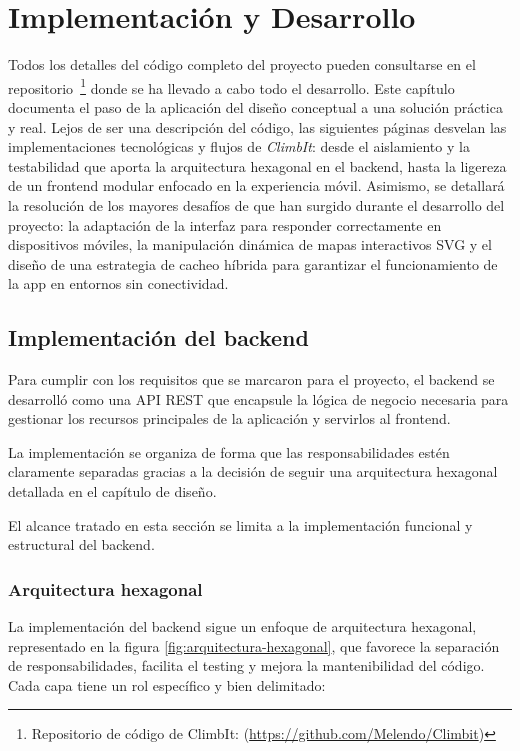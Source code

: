 \chapter{Implementación y Desarrollo}
\label{cap:implementacion}

Todos los detalles del código completo del proyecto pueden consultarse en el repositorio~\footnote{Repositorio de código de ClimbIt: (\url{https://github.com/Melendo/Climbit})} donde se ha llevado a cabo todo el desarrollo. Este capítulo documenta el paso de la aplicación del diseño conceptual a una solución práctica y real. Lejos de ser una descripción del código, las siguientes páginas desvelan las implementaciones tecnológicas y flujos de \textit{ClimbIt}: desde el aislamiento y la testabilidad que aporta la arquitectura hexagonal en el backend, hasta la ligereza de un frontend modular enfocado en la experiencia móvil. Asimismo, se detallará la resolución de los mayores desafíos de que han surgido durante el desarrollo del proyecto: la adaptación de la interfaz para responder correctamente en dispositivos móviles, la manipulación dinámica de mapas interactivos SVG y el diseño de una estrategia de cacheo híbrida para garantizar el funcionamiento de la app en entornos sin conectividad.

\section{Implementación del backend}

Para cumplir con los requisitos que se marcaron para el proyecto, el backend se desarrolló como una API REST 
que encapsule la lógica de negocio necesaria para gestionar los recursos principales de la aplicación y servirlos al frontend.

La implementación se organiza de forma que las responsabilidades estén claramente separadas gracias a la decisión 
de seguir una arquitectura hexagonal detallada en el capítulo de diseño. 

El alcance tratado en esta sección se limita a la implementación funcional y estructural del backend.

\subsection{Arquitectura hexagonal}

La implementación del backend sigue un enfoque de arquitectura hexagonal, representado en la figura \ref{fig:arquitectura-hexagonal}, que favorece la separación de responsabilidades, 
facilita el testing y mejora la mantenibilidad del código. Cada capa tiene un rol específico y bien delimitado:

